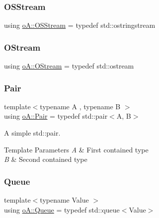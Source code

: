 \subsubsection{\texorpdfstring{O\+S\+Stream}{OSStream}}
{\footnotesize\ttfamily using \mbox{\hyperlink{namespaceo_a_a9075675ddf98c92f09ba17d3b993a72a}{o\+A\+::\+O\+S\+Stream}} = typedef std\+::ostringstream}

\mbox{\label{namespaceo_a_ab69b2110953f22401259db9c6ddc7905}} 
\subsubsection{\texorpdfstring{O\+Stream}{OStream}}
{\footnotesize\ttfamily using \mbox{\hyperlink{namespaceo_a_ab69b2110953f22401259db9c6ddc7905}{o\+A\+::\+O\+Stream}} = typedef std\+::ostream}

\mbox{\label{namespaceo_a_a2e4add9f777dcae3f5afde9e90c75b66}} 
\subsubsection{\texorpdfstring{Pair}{Pair}}
{\footnotesize\ttfamily template$<$typename A , typename B $>$ \\
using \mbox{\hyperlink{namespaceo_a_a2e4add9f777dcae3f5afde9e90c75b66}{o\+A\+::\+Pair}} = typedef std\+::pair$<$A, B$>$}



A simple std\+::pair. 


\begin{DoxyTemplParams}{Template Parameters}
{\em A} & First contained type \\
\hline
{\em B} & Second contained type \\
\hline
\end{DoxyTemplParams}
\mbox{\label{namespaceo_a_a797c449312e4921e82e3f05a2562bb97}} 
\subsubsection{\texorpdfstring{Queue}{Queue}}
{\footnotesize\ttfamily template$<$typename Value $>$ \\
using \mbox{\hyperlink{namespaceo_a_a797c449312e4921e82e3f05a2562bb97}{o\+A\+::\+Queue}} = typedef std\+::queue$<$Value$>$}



